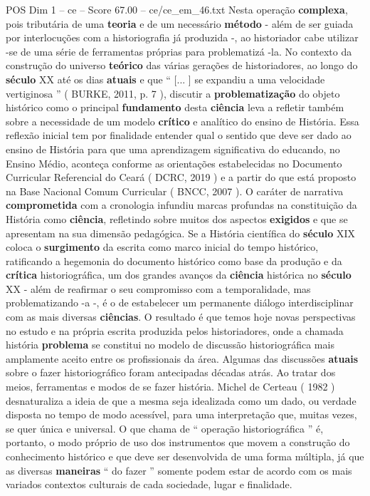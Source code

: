 \begin{textsample}{POS Dim 1 – ce – Score 67.00 – ce/ce\_em\_46.txt}
Nesta operação \textbf{complexa}, pois tributária de uma \textbf{teoria} e de um necessário \textbf{método} - além de ser guiada por interlocuções com a historiografia já produzida -, ao historiador cabe utilizar -se de uma série de ferramentas próprias para problematizá -la.
No contexto da construção do universo \textbf{teórico} das várias gerações de historiadores, ao longo do \textbf{século} XX até os dias \textbf{atuais} e que “ [... ] se expandiu a uma velocidade vertiginosa ” ( BURKE, 2011, p. 7 ), discutir a \textbf{problematização} do objeto histórico como o principal \textbf{fundamento} desta \textbf{ciência} leva a refletir também sobre a necessidade de um modelo \textbf{crítico} e analítico do ensino de História.
Essa reflexão inicial tem por finalidade entender qual o sentido que deve ser dado ao ensino de História para que uma aprendizagem significativa do educando, no Ensino Médio, aconteça conforme as orientações estabelecidas no Documento Curricular Referencial do Ceará ( DCRC, 2019 ) e a partir do que está proposto na Base Nacional Comum Curricular ( BNCC, 2007 ).
O caráter de narrativa \textbf{comprometida} com a cronologia infundiu marcas profundas na constituição da História como \textbf{ciência}, refletindo sobre muitos dos aspectos \textbf{exigidos} e que se apresentam na sua dimensão pedagógica.
Se a História científica do \textbf{século} XIX coloca o \textbf{surgimento} da escrita como marco inicial do tempo histórico, ratificando a hegemonia do documento histórico como base da produção e da \textbf{crítica} historiográfica, um dos grandes avanços da \textbf{ciência} histórica no \textbf{século} XX - além de reafirmar o seu compromisso com a temporalidade, mas problematizando -a -, é o de estabelecer um permanente diálogo interdisciplinar com as mais diversas \textbf{ciências}.
O resultado é que temos hoje novas perspectivas no estudo e na própria escrita produzida pelos historiadores, onde a chamada história \textbf{problema} se constitui no modelo de discussão historiográfica mais amplamente aceito entre os profissionais da área.
Algumas das discussões \textbf{atuais} sobre o fazer historiográfico foram antecipadas décadas atrás.
Ao tratar dos meios, ferramentas e modos de se fazer história.
Michel de Certeau ( 1982 ) desnaturaliza a ideia de que a mesma seja idealizada como um dado, ou verdade disposta no tempo de modo acessível, para uma interpretação que, muitas vezes, se quer única e universal.
O que chama de “ operação historiográfica ” é, portanto, o modo próprio de uso dos instrumentos que movem a construção do conhecimento histórico e que deve ser desenvolvida de uma forma múltipla, já que as diversas \textbf{maneiras} “ do fazer ” somente podem estar de acordo com os mais variados contextos culturais de cada sociedade, lugar e finalidade.

\end{textsample}

